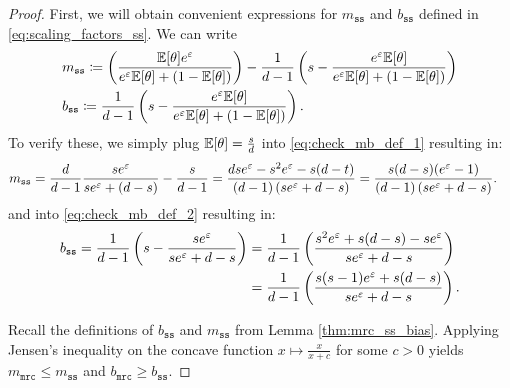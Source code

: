 \begin{proof}
First, we will obtain convenient expressions for $m_{\texttt{ss}}$ and $b_{\texttt{ss}}$ defined in \eqref{eq:scaling_factors_ss}. We can write 
\begin{align}
& m_{\texttt{ss}} \coloneqq  \left( \frac{\mathbb{E}[\theta]e^\varepsilon}{e^\varepsilon \mathbb{E}[\theta]+(1-\mathbb{E}[\theta])}\right) - \frac{1}{d-1}\left( s-\frac{e^\varepsilon \mathbb{E}[\theta]}{e^\varepsilon \mathbb{E}[\theta]+(1-\mathbb{E}[\theta])} \right) \label{eq:check_mb_def_1}\\
& b_{\texttt{ss}} \coloneqq \frac{1}{d-1}\left( s-\frac{e^\varepsilon\mathbb{E}[\theta]}{e^\varepsilon \mathbb{E}[\theta] + (1-\mathbb{E}[\theta])} \right). \label{eq:check_mb_def_2}   
\end{align}
To verify these, we simply plug  $\mathbb{E}[\theta] = \frac{s}{d}$ into \eqref{eq:check_mb_def_1} resulting in:
\begin{align*}
    m_{\texttt{ss}} & = \frac{d}{d-1}\frac{se^\varepsilon}{se^\varepsilon + (d-s)} - \frac{s}{d-1}  = \frac{d s e^\varepsilon - s^2 e^\varepsilon - s(d-t)}{(d-1)\left( s e^\varepsilon+d-s\right)}  = \frac{s(d-s)(e^\varepsilon-1)}{(d-1)\left( se^\varepsilon+d-s\right)}.
\end{align*}
and into \eqref{eq:check_mb_def_2} resulting in:
\begin{align*}
    b_{\texttt{ss}} = \frac{1}{d-1}\left( s - \frac{se^\varepsilon}{se^\varepsilon + d - s} \right) 
    & =  \frac{1}{d-1}\left( \frac{s^2e^\varepsilon + s(d -s)-se^\varepsilon}{se^\varepsilon + d - s} \right) \\
    & = \frac{1}{d-1}\left( \frac{s(s-1)e^\varepsilon + s(d -s)}{se^\varepsilon + d - s} \right).
\end{align*}

Recall the definitions of
$b_{\texttt{ss}}$ and $m_{\texttt{ss}}$ from Lemma \ref{thm:mrc_ss_bias}. Applying Jensen's inequality on the concave function $x\mapsto \frac{x}{x+c}$ for some $c >0$ yields $m_{\texttt{mrc}}\leq m_{\texttt{ss}}$ and $b_{\texttt{mrc}} \geq b_{\texttt{ss}}$.


\end{proof}
